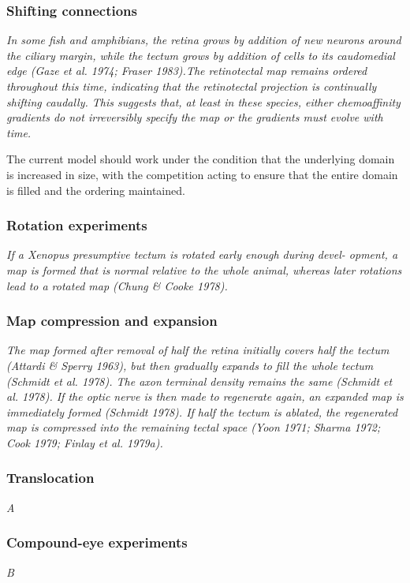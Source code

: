 \documentclass[11pt, a4paper]{article}
\makeatletter
\DeclareRobustCommand{\selectlanguage}[1]{%
  \@ifundefined{alias@\string#1}
    {\ORIGselectlanguage{#1}}
    {\begingroup\edef\x{\endgroup
       \noexpand\ORIGselectlanguage{\@nameuse{alias@#1}}}\x}%
}
\makeatother
\begin{document}
\subsubsection{Shifting connections}

\begin{displayquote}
\emph{In some fish and amphibians, the retina grows by addition of new neurons
around the ciliary margin, while the tectum grows by addition of cells to its
caudomedial edge (Gaze et al. 1974; Fraser 1983).The retinotectal map remains
ordered throughout this time, indicating that the retinotectal projection is
continually shifting caudally. This suggests that, at least in these species,
either chemoaffinity gradients do not irreversibly specify the map or the
gradients must evolve with time.}
\end{displayquote}

The current model should work under the condition that the underlying domain
is increased in size, with the competition acting to ensure that the entire
domain is filled and the ordering maintained.

\subsubsection{Rotation experiments}

\begin{displayquote}
\emph{If a Xenopus presumptive tectum is rotated early enough during devel- opment,
a map is formed that is normal relative to the whole animal, whereas later
rotations lead to a rotated map (Chung \& Cooke 1978).}
\end{displayquote}

\subsubsection{Map compression and expansion}

\begin{displayquote}
\emph{The map formed after removal of half the retina initially covers half the
tectum (Attardi \& Sperry 1963), but then gradually expands to fill the whole
tectum (Schmidt et al. 1978). The axon terminal density remains the same
(Schmidt et al.  1978). If the optic nerve is then made to regenerate again,
an expanded map is immediately formed (Schmidt 1978). If half the tectum is
ablated, the regenerated map is compressed into the remaining tectal space
(Yoon 1971; Sharma 1972; Cook 1979; Finlay et al. 1979a).}
\end{displayquote}

\subsubsection{Translocation}

\begin{displayquote}
\emph{A}
\end{displayquote}


\subsubsection{Compound-eye experiments}

\begin{displayquote}
\emph{B}
\end{displayquote}


%
%
\selectlanguage{English}


\end{document}
